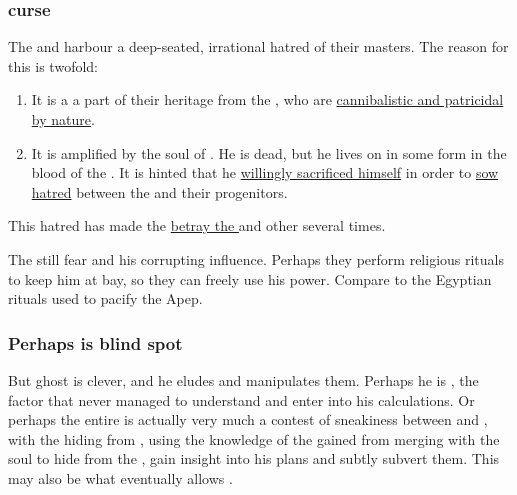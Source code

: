 \subsubsection{\Nexagglacheldraexz{} curse}
\label{\Nexagglacheldraexz{} curse}
\label{Nexagglacheldraex's curse}
\label{Satharioth hate Banes}
The \satharioth{} and \ketherain{} harbour a deep-seated, irrational hatred of their \bane{} masters. The reason for this is twofold:

\begin{enumerate}
  \item 
    It is a a part of their heritage from the \banes, who are \hyperref[Bane cannibalism]{cannibalistic and patricidal by nature}. 
  \item
    It is amplified by the soul of \Nexagglacheldraex. He is dead, but he lives on in some form in the blood of the \satharioth. It is hinted that he \hyperref[Nexagglacheldraex sacrifices himself]{willingly sacrificed himself} in order to \hyperref[Nexagglacheldraex makes Satharioth hate Banes]{sow hatred} between the \resphain{} and their \bane{} progenitors.
\end{enumerate}

This hatred has made the \satharioth{} \hyperref[Satharioth betray Banes]{betray the \banes} and other \resphain{} several times. 

The \resphain{} still fear \Nexagglacheldraex{} and his corrupting influence. Perhaps they perform religious rituals to keep him at bay, so they can freely use his power. Compare to the Egyptian rituals used to pacify the \dragon{} Apep.





\subsubsection{Perhaps \Nexagglacheldraex{} is \Daggerrainz{} blind spot}
\label{Nexagglacheldraex is Daggerrain's blind spot}
But \Nexagglacheldraexz{} ghost is clever, and he eludes and manipulates them. 
Perhaps he is , the factor that \Daggerrain{} never managed to understand and enter into his calculations. 
Or perhaps the entire \feud{} is actually very much a contest of sneakiness between \Nexagglacheldraex{} and \Daggerrain, with the \dragonlord{} hiding from \Daggerrain, using the knowledge of the \banes{} gained from merging with the \resphan{} soul to hide from the \banelord{}, gain insight into his plans and subtly subvert them. 
This may also be what eventually allows .





